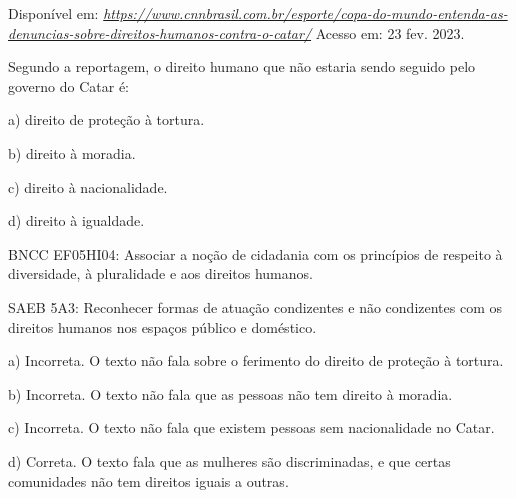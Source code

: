 Disponível em:
\href{https://www.cnnbrasil.com.br/esporte/copa-do-mundo-entenda-as-denuncias-sobre-direitos-humanos-contra-o-catar/}{\emph{https://www.cnnbrasil.com.br/esporte/copa-do-mundo-entenda-as-denuncias-sobre-direitos-humanos-contra-o-catar/}}
Acesso em: 23 fev. 2023.

Segundo a reportagem, o direito humano que não estaria sendo seguido
pelo governo do Catar é:

a) direito de proteção à tortura.

b) direito à moradia.

c) direito à nacionalidade.

d) direito à igualdade.

BNCC EF05HI04: Associar a noção de cidadania com os princípios de
respeito à diversidade, à pluralidade e aos direitos humanos.

SAEB 5A3: Reconhecer formas de atuação condizentes e não condizentes com
os direitos humanos nos espaços público e doméstico.

a) Incorreta. O texto não fala sobre o ferimento do direito de proteção
à tortura.

b) Incorreta. O texto não fala que as pessoas não tem direito à moradia.

c) Incorreta. O texto não fala que existem pessoas sem nacionalidade no
Catar.

d) Correta. O texto fala que as mulheres são discriminadas, e que certas
comunidades não tem direitos iguais a outras.
